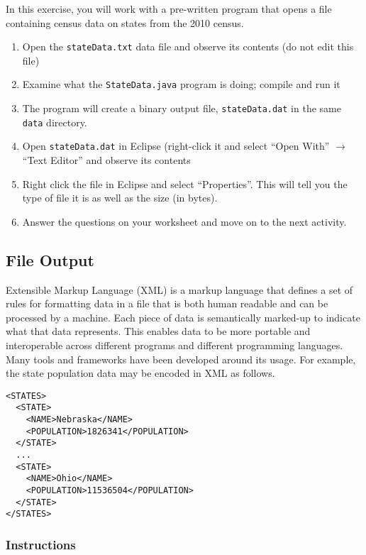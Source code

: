 \documentclass[12pt]{scrartcl}
\begin{document}
In this exercise, you will work with a pre-written program that opens 
a file containing census data on states from the 2010 census.  
\begin{enumerate}
  \item Open the \texttt{stateData.txt} data file and observe its contents 
	(do not edit this file)
  \item Examine what the \texttt{StateData.java} program is doing; 
	compile and run it
  \item The program will create a binary output file, 
    \texttt{stateData.dat} in the same \texttt{data}
    directory.  
  \item Open \texttt{stateData.dat} in Eclipse (right-click it
  	and select ``Open With'' $\rightarrow$ ``Text Editor'' and
	observe its contents
  \item Right click the file in Eclipse and select ``Properties''.
    This will tell you the type of file it is as well as the size
    (in bytes).
  \item Answer the questions on your worksheet and move on to the next activity.
\end{enumerate}

\subsection{File Output}

Extensible Markup Language (XML) is a markup language that defines a set 
of rules for formatting data in a file that is both human readable and can be 
processed by a machine.  Each piece of data is semantically marked-up to 
indicate what that data represents.  This enables data to be more portable 
and interoperable across different programs and different programming 
languages.  Many tools and frameworks have been developed around its 
usage.  For example, the state population data may be encoded in XML 
as follows.

\begin{verbatim}
<STATES>
  <STATE>
    <NAME>Nebraska</NAME>
    <POPULATION>1826341</POPULATION>
  </STATE>
  ...
  <STATE>
    <NAME>Ohio</NAME>
    <POPULATION>11536504</POPULATION>
  </STATE>
</STATES>
\end{verbatim}

\subsubsection*{Instructions}
\end{document}
